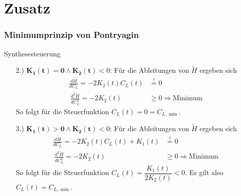 \documentclass[aspectratio=169]{beamer}
\begin{document}
\section*{Zusatz}
\begin{frame}
  \frametitle{Minimumprinzip von Pontryagin}
    \tiny
  \begin{block}{Synthesesteuerung}  
      \begin{enumerate}
          \item[2.)] $\mathbf{K_1(t) = 0 \wedge K_2(t)} < 0$: Für die Ableitungen von $\tilde{H}$ ergeben sich
        \[\begin{split}
        \frac{d \tilde{H}}{d C_L} = - 2 K_2(t) C_L(t) &\stackrel{!}{=} 0 \\\
        \frac{d^2 \tilde{H}}{d C_L^2} = - 2 K_2(t) &\geq 0 \Rightarrow \text{Minimum}
        \end{split}\]
        So folgt für die Steuerfunktion $C_L(t) = 0 = C_{L, \min}$.
        \item[3.)] $\mathbf{K_1(t) > 0 \wedge K_2(t)} < 0$: Für die Ableitungen von $\tilde{H}$ ergeben sich
        \[\begin{split}
        \frac{d \tilde{H}}{d C_L} = - 2 K_2(t) C_L(t) + K_1(t) &\stackrel{!}{=} 0 \\\
        \frac{d^2 \tilde{H}}{d C_L^2} = - 2 K_2(t) &\geq 0 \Rightarrow \text{Minimum}
        \end{split}\]
        So folgt für die Steuerfunktion $C_L(t) = \dfrac{K_1(t)}{2 K_2(t)} < 0$. Es gilt also $C_L(t) = C_{L, \min}$.
        \end{enumerate}
      \end{block}
\end{frame}
\end{document}
